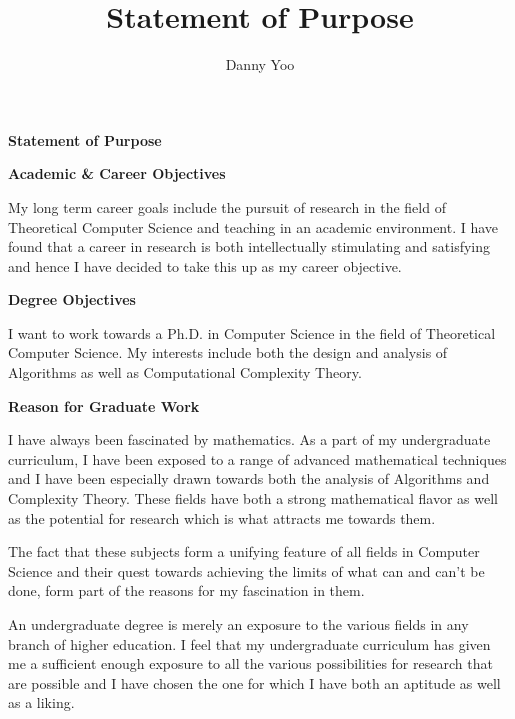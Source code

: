 %
%

\documentstyle[a4wide,12pt]{}
\title{Statement of Purpose}
\author{Danny Yoo}
\date{}

\begin{center}
{\Large \bf
	Statement of Purpose
}
\end{center}

\begin{flushleft}
{\bf Academic \& Career Objectives}
\end{flushleft}

	My long term career goals include the pursuit of research in
the field of Theoretical Computer Science and teaching in an academic
environment. I have found that a career in research is both
intellectually stimulating and satisfying and hence I have decided to
take this up as my career objective.

\begin{flushleft}
{\bf Degree Objectives}
\end{flushleft}

	I want to work towards a Ph.D. in Computer Science in the
field of Theoretical Computer Science. My interests include both the
design and analysis of Algorithms as well as Computational Complexity Theory.

\begin{flushleft}
{\bf Reason for Graduate Work}
\end{flushleft}

	I have always been fascinated by mathematics. As a part of my
undergraduate curriculum, I have been exposed to a range of
advanced mathematical techniques and I have been especially drawn towards
both the analysis of Algorithms and Complexity Theory. These fields
have both a strong mathematical flavor as well as the potential for
research which is what attracts me towards them.

	The fact that these subjects form a unifying feature of all
fields in Computer Science and their quest towards achieving the limits
of what can and can't be done, form part of the reasons for my
fascination in them.

	An undergraduate degree is merely an exposure to the various
fields in any branch of higher education. I feel that my
undergraduate curriculum has given me a sufficient enough exposure to
all the various possibilities for research that are possible and I
have chosen the one for which I have both an aptitude as well as a liking.

